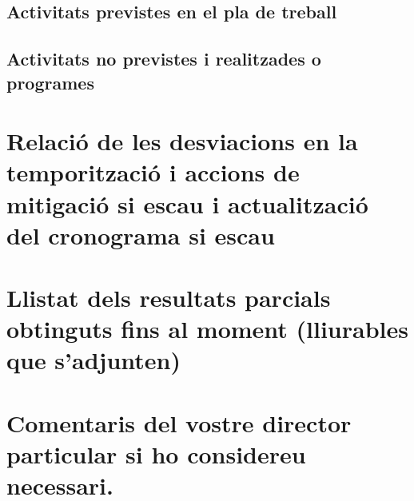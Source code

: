 \documentclass[]{article}
\begin{document}
         \subsection{Activitats previstes en el pla de treball}

         \subsection{Activitats no previstes i realitzades o programes}

   \section{Relació de les desviacions en la temporització i accions de mitigació si escau i actualització del cronograma si escau}

   \section{Llistat dels resultats parcials obtinguts fins al moment (lliurables que s'adjunten)}

   \section{Comentaris del vostre director particular si ho considereu necessari.}
\end{document}
